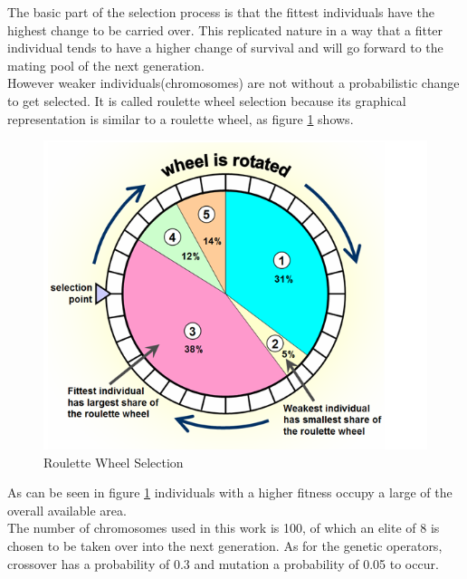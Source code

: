 The basic part of the selection process is that the fittest individuals have the highest change to be carried over. This replicated nature in a way that a fitter individual tends to have a higher change of survival and will go forward to the mating pool of the next generation.\\
However weaker individuals(chromosomes) are not without a probabilistic change to get selected. 
It is called roulette wheel selection because its graphical representation is similar to a roulette wheel, as figure \ref{fig:selection} shows\cite{1631619}.

\begin{figure}[h]
\begin{center}
\includegraphics[scale=0.4]{Chapter1/images/roulette_wheel.png} 
\caption[Roulette Wheel Selection]{Roulette Wheel Selection\footnotemark}
\label{fig:selection}
\end{center}
\end{figure} 


As can be seen in figure \ref{fig:selection} individuals with a higher fitness occupy a large of the overall available area. \\

The number of chromosomes used in this work is 100, of which an elite of 8 is chosen to be taken over into the next generation. 
As for the genetic operators, crossover has a probability of 0.3 and mutation a probability of 0.05 to occur.

